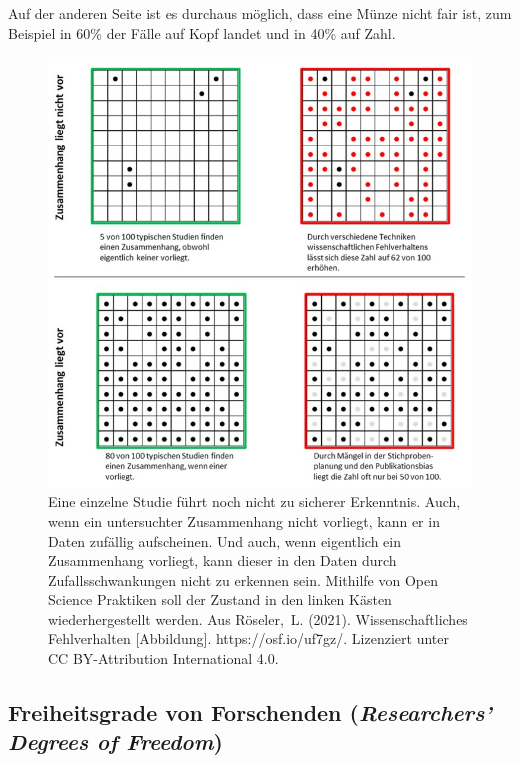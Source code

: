 \documentclass[
  letterpaper,
  DIV=11,
  numbers=noendperiod]{scrreprt}
\begin{document}
\begin{tcolorbox}
Auf der anderen Seite ist es durchaus möglich, dass eine Münze nicht
fair ist, zum Beispiel in 60\% der Fälle auf Kopf landet und in 40\% auf
Zahl.~

\begin{figure}[H]

{\centering \includegraphics{images/freiheitsgrade.jpg}

}

\caption{Eine einzelne Studie führt noch nicht zu sicherer Erkenntnis.
Auch, wenn ein untersuchter Zusammenhang nicht vorliegt, kann er in
Daten zufällig aufscheinen. Und auch, wenn eigentlich ein Zusammenhang
vorliegt, kann dieser in den Daten durch Zufallsschwankungen nicht zu
erkennen sein. Mithilfe von Open Science Praktiken soll der Zustand in
den linken Kästen wiederhergestellt werden. Aus Röseler,~L. (2021).
Wissenschaftliches Fehlverhalten {[}Abbildung{]}. https://osf.io/uf7gz/.
Lizenziert unter CC BY-Attribution International 4.0.}

\end{figure}%

\end{tcolorbox}

\subsection{\texorpdfstring{Freiheitsgrade von Forschenden
(\emph{Researchers' Degrees of
Freedom})}{Freiheitsgrade von Forschenden (Researchers' Degrees of Freedom)}}\label{freiheitsgrade-von-forschenden-researchers-degrees-of-freedom}
\end{document}

